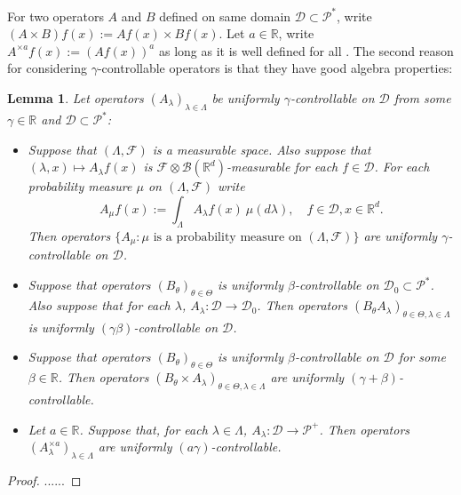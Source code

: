\documentclass[12pt,oneside,english]{amsart}
\theoremstyle{plain}
\newtheorem{lem}[thm]{Lemma}
\theoremstyle{definition}
\numberwithin{equation}{section}
\newcommand{\added}[1]{{\color{blue}#1}}\newcommand{\deleted}[1]{{\color{red}#1}}
\begin{document}
\added{
    For two operators $A$ and $B$ defined on same domain $\mathcal D\subset \mathcal P^*$, write $(A\times B)f (x):= Af(x) \times Bf(x)$. 
    Let $a \in \mathbb R$, write $A^{\times a}f(x):= (Af(x))^a$ as long as it is well defined for all .
    The second reason for considering $\gamma$-controllable operators is that they have good algebra properties: 
\begin{lem}
\label{lem: property of controllable operators}
    Let operators $(A_\lambda)_{\lambda\in \Lambda}$ be uniformly $\gamma$-controllable on $\mathcal D$ from some $\gamma \in \mathbb R$ and $\mathcal D\subset \mathcal P^*$:
\begin{itemize}
\item[(1)]
    Suppose that $(\Lambda, \mathscr F)$ is a measurable space.
    Also suppose that $(\lambda,x)\mapsto A_\lambda f(x)$ is $\mathscr F \otimes \mathscr B(\mathbb R^d)$-measurable for each $f\in \mathcal D$.
    For each probability measure $\mu$ on $(\Lambda, \mathscr F)$ write
\[
    A_\mu f(x):= \int_{\Lambda} A_\lambda f (x)~\mu(d\lambda), \quad f\in \mathcal D, x\in \mathbb R^d.
\]
    Then operators $\{A_\mu: \mu \text{ is  a probability measure on } (\Lambda, \mathscr F)\}$ are uniformly $\gamma$-controllable on $\mathcal D$.
\item[(2)]
    Suppose that operators $(B_\theta)_{\theta\in \Theta}$ is uniformly $\beta$-controllable on $\mathcal D_0 \subset \mathcal P^*$. 
    Also suppose that for each $\lambda$, $A_\lambda:\mathcal D \to \mathcal D_0$.
    Then operators $(B_\theta A_\lambda)_{\theta\in \Theta, \lambda \in \Lambda}$ is uniformly $(\gamma\beta)$-controllable on $\mathcal D$.
\item[(3)]
    Suppose that operators $(B_\theta)_{\theta \in \Theta}$ is uniformly $\beta$-controllable on $\mathcal D$ for some $\beta\in \mathbb R$.
    Then operators $(B_\theta\times A_\lambda)_{\theta \in \Theta, \lambda \in \Lambda}$ are uniformly $(\gamma+\beta)$-controllable.
\item[(4)]
    Let $a\in \mathbb R$. Suppose that, for each $\lambda \in \Lambda$, $A_\lambda : \mathcal D \to \mathcal P^+$.
    Then operators $(A^{\times a}_\lambda)_{\lambda \in \Lambda}$ are uniformly $(a\gamma)$-controllable.
\end{itemize}
\end{lem}
\begin{proof}
    ......
\end{proof}
}
\end{document}
